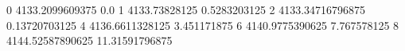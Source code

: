 0 4133.2099609375 0.0
1 4133.73828125 0.5283203125
2 4133.34716796875 0.13720703125
4 4136.6611328125 3.451171875
6 4140.9775390625 7.767578125
8 4144.52587890625 11.31591796875
